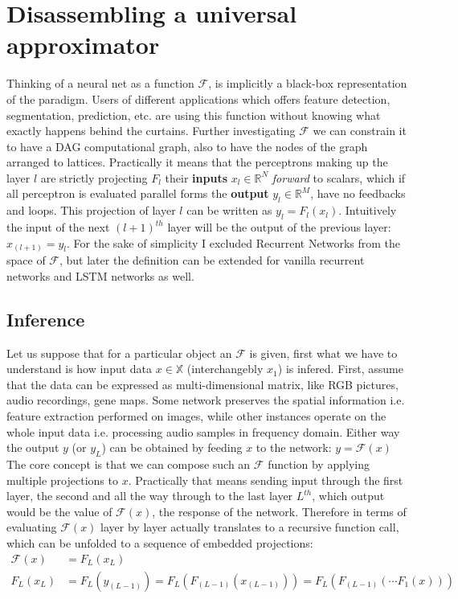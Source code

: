 \section{Disassembling a universal approximator}
Thinking of a neural net as a function \(\mathcal{F}\), is implicitly a black-box representation of the paradigm.
Users of different applications which offers feature detection, segmentation, prediction, etc. are using this function without knowing what exactly happens behind the curtains. 
Further investigating \(\mathcal{F}\) we can constrain it to have a DAG computational graph, also to have the nodes of the graph arranged to lattices.
Practically it means that the perceptrons making up the layer \(l\) are strictly projecting $F_l$ their \textbf{inputs} 
$ x_l \in \mathbb{R}^N $ \emph{forward} to scalars, which if all perceptron is evaluated parallel forms the 
\textbf{output} $y_l \in \mathbb{R}^M$, have no feedbacks and loops. 
This projection of layer $l$ can be written as $y_l = F_l(x_l)$. 
Intuitively the input of the next $(l+1)^{th}$ layer will be the output of the previous layer:
$x_{(l+1)} = y_l$.
For the sake of simplicity I excluded Recurrent Networks from the space of $\mathcal{F}$, but later the definition can be extended for vanilla recurrent networks and LSTM networks as well.

\subsection{Inference}
Let us suppose that for a particular object an $\mathcal{F}$ is given, first what we have to understand is how input data 
$x \in \mathbb{X}$ (interchangebly $x_1$) is infered.
First, assume that the data can be expressed as multi-dimensional matrix, like RGB pictures, audio recordings, gene maps.
Some network preserves the spatial information i.e. feature extraction performed on images, 
while other instances operate on the whole input data i.e. processing audio samples in frequency domain.
Either way the output $y$ (or $y_L$) can be obtained by feeding $x$ to the network: 
$ y = \mathcal{F}(x)$
The core concept is that we can compose such an $\mathcal{F}$ function by applying multiple projections to $x$.
Practically that means sending input through the first layer, the second and all the way through to the last layer $L^{th}$, which output would be the value of $\mathcal{F}(x)$, the response of the network.
Therefore in terms of evaluating $\mathcal{F}(x)$ layer by layer actually translates to a recursive function call, which can be unfolded to a sequence of embedded projections:
\begin{equation}\label{eq:forward}
\begin{split}
    \mathcal{F}(x) & = F_L(x_L) \\
    F_L(x_L) & = F_L(y_{(L-1)}) = F_L(F_{(L-1)}(x_{(L-1)})) = F_L(F_{(L-1)}(\cdots F_1(x)))
\end{split}
\end{equation}

